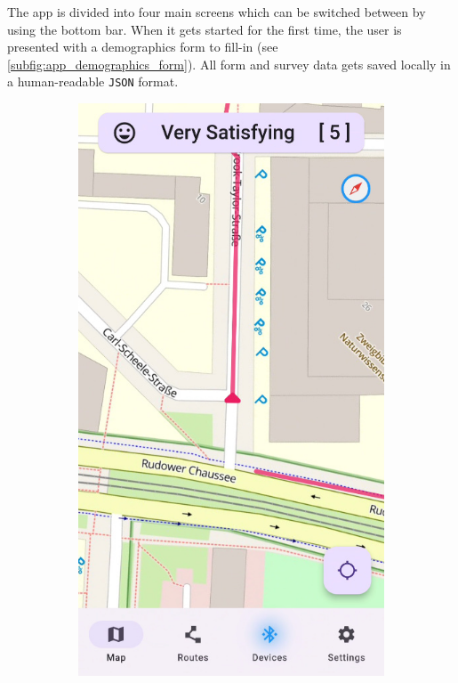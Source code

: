 The app is divided into four main screens which can be switched between by using the bottom bar.
When it gets started for the first time, the user is presented with a demographics form to fill-in (see \autoref{subfig:app_demographics_form}).
All form and survey data gets saved locally in a human-readable \texttt{JSON} format.

\begin{figure}[!htb]
    \centering
    \begin{subfigure}{.25\textwidth}
        \centering
        \includegraphics[width=.8666\linewidth]{images/app_map_screen.jpg}

\end{subfigure}
\end{figure}
